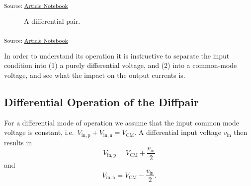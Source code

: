 \documentclass[
  a4paper,
  DIV=11,
  numbers=noendperiod]{scrartcl}
\begin{document}
\textsubscript{Source:
\href{https://iic-jku.github.io/analog-circuit-design/index.qmd.html}{Article
Notebook}}

\begin{figure}[H]


\caption{\label{fig-differential-pair}A differential pair.}

\end{figure}%

\textsubscript{Source:
\href{https://iic-jku.github.io/analog-circuit-design/index.qmd.html}{Article
Notebook}}

In order to understand its operation it is instructive to separate the
input condition into (1) a purely differential voltage, and (2) into a
common-mode voltage, and see what the impact on the output currents is.

\subsection{Differential Operation of the
Diffpair}\label{differential-operation-of-the-diffpair}

For a differential mode of operation we assume that the input common
mode voltage is constant,
i.e.~\(V_\mathrm{in,p} + V_\mathrm{in,n} = V_\mathrm{CM}\). A
differential input voltage \(v_\mathrm{in}\) then results in \[
V_\mathrm{in,p} = V_\mathrm{CM} + \frac{v_\mathrm{in}}{2}
\] and \[
V_\mathrm{in,n} = V_\mathrm{CM} - \frac{v_\mathrm{in}}{2}.
\]
\end{document}
